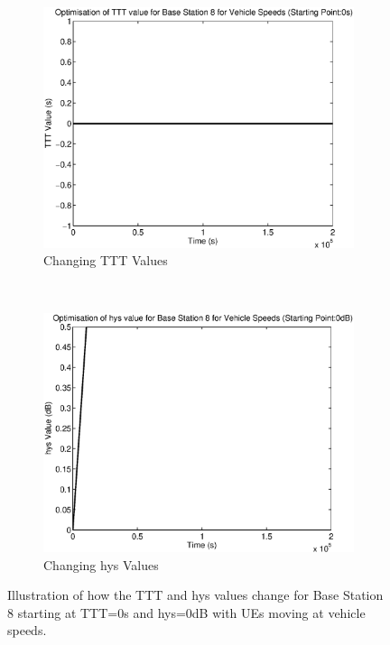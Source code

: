 \begin{figure}[H]
        \centering
        \begin{subfigure}[b]{0.49\textwidth}
                \includegraphics[width=\textwidth]{figures/graphs/vehlow/TTT8.eps}
                \caption{Changing TTT Values}
        \end{subfigure}%
        ~ %
        \begin{subfigure}[b]{0.49\textwidth}
                \includegraphics[width=\textwidth]{figures/graphs/vehlow/hys8.eps}
                \caption{Changing hys Values}
        \end{subfigure}
        \caption{Illustration of how the TTT and hys values change for Base Station 8 starting at TTT=0s and hys=0dB with UEs moving at vehicle speeds.}
\end{figure}
